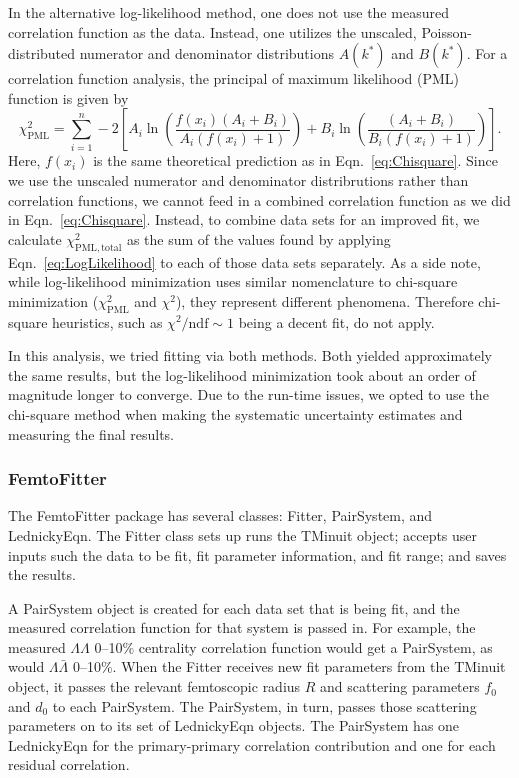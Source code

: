 In the alternative log-likelihood method, one does not use the measured correlation function as the data.
Instead, one utilizes the unscaled, Poisson-distributed numerator and denominator distributions $A(k^*)$ and $B(k^*)$.
For a correlation function analysis, the principal of maximum likelihood (PML) function is given \cite{Ahle:2002mi} by
\begin{equation}
\label{eq:LogLikelihood}
\chi^2_{\mathrm{PML}} = \sum_{i = 1}^{n} 
-2 \left[A_i \ln  \left(\frac{f(x_i) (A_i + B_i)}{A_i(f(x_i) + 1)}\right) + B_i \ln \left(\frac{(A_i + B_i)}{B_i(f(x_i) + 1)}\right)\right].
\end{equation}
Here, $f(x_i)$ is the same theoretical prediction as in Eqn.\ \ref{eq:Chisquare}.
Since we use the unscaled numerator and denominator distribrutions rather than correlation functions, we cannot feed in a combined correlation function as we did in Eqn.\ \ref{eq:Chisquare}. Instead, to combine data sets for an improved fit, we calculate $\chi^2_\mathrm{PML,total}$ as the sum of the values found by applying Eqn.\ \ref{eq:LogLikelihood} to each of those data sets separately.
As a side note, while log-likelihood minimization uses similar nomenclature to chi-square minimization ($\chi^2_\mathrm{PML}$ and $\chi^2$), they represent different phenomena. Therefore chi-square heuristics, such as $\chi^2 / \mathrm{ndf} \sim 1$ being a decent fit, do not apply.

In this analysis, we tried fitting via both methods. 
Both yielded approximately the same results, but the log-likelihood minimization took about an order of magnitude longer to converge. 
Due to the run-time issues, we opted to use the chi-square method when making the systematic uncertainty estimates and measuring the final results.

\subsubsection{FemtoFitter}
\label{sec:FemtoFitter}

The FemtoFitter package has several classes: Fitter, PairSystem, and LednickyEqn.
The Fitter class sets up runs the TMinuit object; accepts user inputs such the data to be fit, fit parameter information, and fit range; and saves the results.

A PairSystem object is created for each data set that is being fit, and the measured correlation function for that system is passed in. 
For example, the measured $\Lambda\Lambda$ 0--10\% centrality correlation function would get a PairSystem, as would $\Lambda\bar{\Lambda}$ 0--10\%.
When the Fitter receives new fit parameters from the TMinuit object, it passes the relevant femtoscopic radius $R$ and scattering parameters $f_0$ and $d_0$ to each PairSystem.
The PairSystem, in turn, passes those scattering parameters on to its set of LednickyEqn objects.
The PairSystem has one LednickyEqn for the primary-primary correlation contribution and one for each residual correlation.

